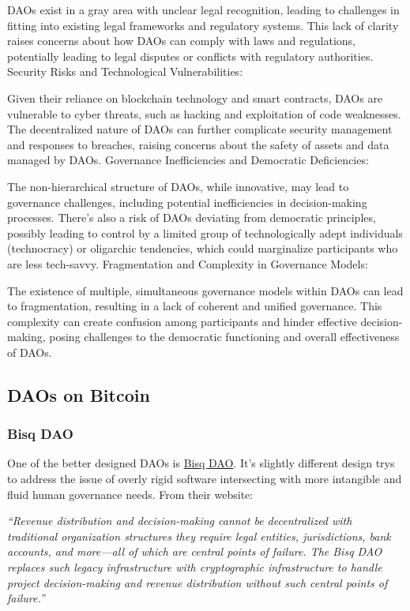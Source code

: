 DAOs exist in a gray area with unclear legal recognition, leading to challenges in fitting into existing legal frameworks and regulatory systems. This lack of clarity raises concerns about how DAOs can comply with laws and regulations, potentially leading to legal disputes or conflicts with regulatory authorities.
Security Risks and Technological Vulnerabilities:

Given their reliance on blockchain technology and smart contracts, DAOs are vulnerable to cyber threats, such as hacking and exploitation of code weaknesses. The decentralized nature of DAOs can further complicate security management and responses to breaches, raising concerns about the safety of assets and data managed by DAOs.
Governance Inefficiencies and Democratic Deficiencies:

The non-hierarchical structure of DAOs, while innovative, may lead to governance challenges, including potential inefficiencies in decision-making processes. There's also a risk of DAOs deviating from democratic principles, possibly leading to control by a limited group of technologically adept individuals (technocracy) or oligarchic tendencies, which could marginalize participants who are less tech-savvy.
Fragmentation and Complexity in Governance Models:

The existence of multiple, simultaneous governance models within DAOs can lead to fragmentation, resulting in a lack of coherent and unified governance. This complexity can create confusion among participants and hinder effective decision-making, posing challenges to the democratic functioning and overall effectiveness of DAOs.

\subsection{DAOs on Bitcoin}
\subsubsection{Bisq DAO}
One of the better designed DAOs is \href{https://bisq.network/dao/}{Bisq DAO}. It's slightly different design trys to address the issue of overly rigid software intersecting with more intangible and fluid human governance needs. From their website:\par
\textit{``Revenue distribution and decision-making cannot be decentralized with traditional organization structures they require legal entities, jurisdictions, bank accounts, and more—all of which are central points of failure.
The Bisq DAO replaces such legacy infrastructure with cryptographic infrastructure to handle project decision-making and revenue distribution without such central points of failure.''}
